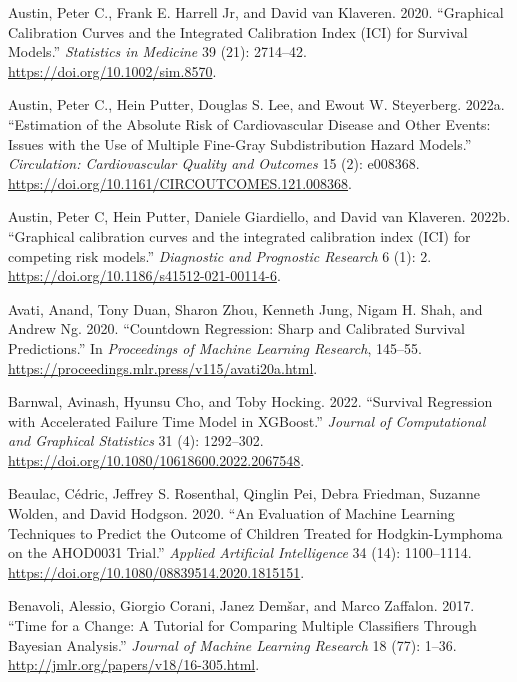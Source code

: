 \documentclass[
  letterpaper,
  krantz2]{style/krantz}
\newlength{\cslhangindent}
\newenvironment{CSLReferences}[2] %
 {\begin{list}{}{%
  \setlength{\itemindent}{0pt}
  \setlength{\leftmargin}{0pt}
  \setlength{\parsep}{0pt}
  \ifodd #1
   \setlength{\leftmargin}{\cslhangindent}
   \setlength{\itemindent}{-1\cslhangindent}
  \fi
  \setlength{\itemsep}{#2\baselineskip}}}
 {\end{list}}
\begin{document}
\begin{CSLReferences}{1}{0}
Austin, Peter C., Frank E. Harrell Jr, and David van Klaveren. 2020.
{``Graphical Calibration Curves and the Integrated Calibration Index
(ICI) for Survival Models.''} \emph{Statistics in Medicine} 39 (21):
2714--42. \url{https://doi.org/10.1002/sim.8570}.

Austin, Peter C., Hein Putter, Douglas S. Lee, and Ewout W. Steyerberg.
2022a. {``Estimation of the Absolute Risk of Cardiovascular Disease and
Other Events: Issues with the Use of Multiple Fine-Gray Subdistribution
Hazard Models.''} \emph{Circulation: Cardiovascular Quality and
Outcomes} 15 (2): e008368.
\url{https://doi.org/10.1161/CIRCOUTCOMES.121.008368}.

Austin, Peter C, Hein Putter, Daniele Giardiello, and David van
Klaveren. 2022b. {``{Graphical calibration curves and the integrated
calibration index (ICI) for competing risk models}.''} \emph{Diagnostic
and Prognostic Research} 6 (1): 2.
\url{https://doi.org/10.1186/s41512-021-00114-6}.

Avati, Anand, Tony Duan, Sharon Zhou, Kenneth Jung, Nigam H. Shah, and
Andrew Ng. 2020. {``{Countdown Regression: Sharp and Calibrated Survival
Predictions}.''} In \emph{Proceedings of Machine Learning Research},
145--55. \url{https://proceedings.mlr.press/v115/avati20a.html}.

Barnwal, Avinash, Hyunsu Cho, and Toby Hocking. 2022. {``{Survival
Regression with Accelerated Failure Time Model in XGBoost}.''}
\emph{Journal of Computational and Graphical Statistics} 31 (4):
1292--302. \url{https://doi.org/10.1080/10618600.2022.2067548}.

Beaulac, Cédric, Jeffrey S. Rosenthal, Qinglin Pei, Debra Friedman,
Suzanne Wolden, and David Hodgson. 2020. {``An Evaluation of Machine
Learning Techniques to Predict the Outcome of Children Treated for
Hodgkin-Lymphoma on the AHOD0031 Trial.''} \emph{Applied Artificial
Intelligence} 34 (14): 1100--1114.
\url{https://doi.org/10.1080/08839514.2020.1815151}.

Benavoli, Alessio, Giorgio Corani, Janez Demšar, and Marco Zaffalon.
2017. {``Time for a Change: A Tutorial for Comparing Multiple
Classifiers Through Bayesian Analysis.''} \emph{Journal of Machine
Learning Research} 18 (77): 1--36.
\url{http://jmlr.org/papers/v18/16-305.html}.


\end{CSLReferences}
\end{document}
